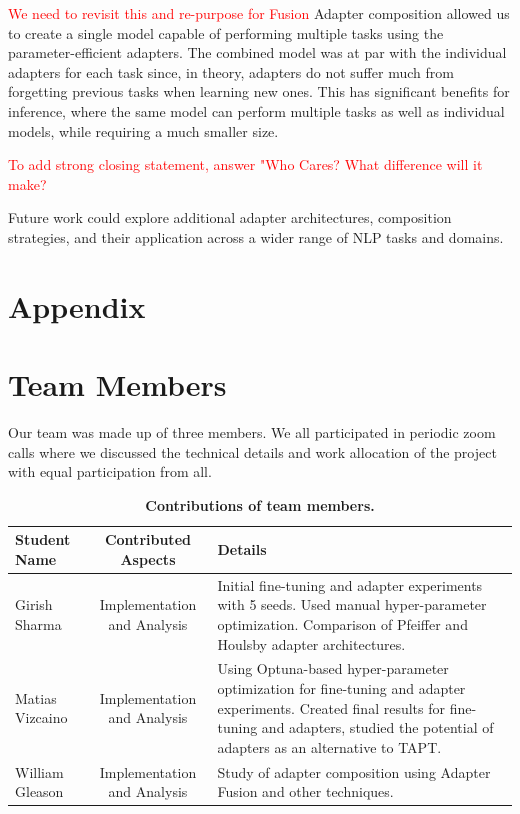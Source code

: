 \documentclass[10pt,twocolumn,letterpaper]{article}
\begin{document}
\textcolor{red}{We need to revisit this and re-purpose for Fusion}
Adapter composition allowed us to create a single model capable of performing multiple tasks using the parameter-efficient adapters. The combined model was at par with the individual adapters for each task since, in theory, adapters do not suffer much from forgetting previous tasks when learning new ones. This has significant benefits for inference, where the same model can perform multiple tasks as well as individual models, while requiring a much smaller size.

\textcolor{red}{To add strong closing statement, answer "Who Cares? What difference will it make?}

Future work could explore additional adapter architectures, composition strategies, and their application across a wider range of NLP tasks and domains.


\onecolumn

\appendix
\renewcommand{\thesection}{Appendix \Alph{section}}
\renewcommand{\thefigure}{\Alph{section}.\arabic{figure}}
\renewcommand{\thetable}{\Alph{section}.\arabic{table}}

\section{Appendix}

\section{Team Members}
Our team was made up of three members. We all participated in periodic zoom calls where we discussed the technical details and work allocation of the project with equal participation from all.

\begin{table}[h]
\begin{center}
\begin{tabular}{|l|c|p{8cm}|}
\hline
\textbf{Student Name} & \textbf{Contributed Aspects} & \textbf{Details} \\
\hline
Girish Sharma & Implementation and Analysis & Initial fine-tuning and adapter experiments with 5 seeds. Used manual hyper-parameter optimization. Comparison of Pfeiffer and Houlsby adapter architectures.  \\
Matias Vizcaino & Implementation and Analysis & Using Optuna-based hyper-parameter optimization for fine-tuning and adapter experiments. Created final results for fine-tuning and adapters, studied the potential of adapters as an alternative to TAPT. \\
William Gleason & Implementation and Analysis & Study of adapter composition using Adapter Fusion and other techniques. \\
\hline
\end{tabular}
\end{center}
\caption{\textbf{Contributions of team members.}}
\label{tab:contributions}
\end{table}
\FloatBarrier
\end{document}
